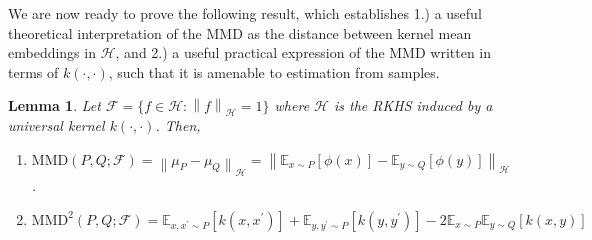 \documentclass[12pt]{article}
\newcommand*{\norm}[1]{\left\lVert#1\right\rVert}
\newcommand{\E}{\mathbb{E}}
\newcommand{\featureMap}{\phi}
\newcommand{\RKHS}{\mathcal{H}}
\newcommand{\Ker}{k}
\newcommand{\meanEmb}[1]{\mu_{#1}}
\newcommand{\MMD}{\text{MMD}}
\newcommand{\MMDSpace}{\mathcal{F}}
\newtheorem{lemma}{Lemma}
\begin{document}
We are now ready to prove the following result, which establishes 1.) a useful theoretical interpretation of the MMD as the distance between kernel mean embeddings in 
$\RKHS$, and 2.) a useful practical expression of the MMD written in terms of $\Ker(\cdot, \cdot)$, such that it is amenable to estimation from samples. 

\begin{lemma} 
Let $\MMDSpace = \{f \in \RKHS: \norm{f}_{\RKHS} = 1\}$ where $\RKHS$ is the RKHS induced by a universal kernel $\Ker(\cdot, \cdot)$. Then, 
\begin{enumerate}
\item $\MMD(P, Q; \MMDSpace) = \norm{\meanEmb{P} - \meanEmb{Q}}_{\RKHS} = \norm{\E_{x \sim P}[\featureMap(x)] - \E_{y \sim Q}[\featureMap(y)]}_{\RKHS}$.
\item $\MMD^2(P, Q; \MMDSpace) = \E_{x, x^\prime \sim P}\left[\Ker(x, x^\prime)\right] + \E_{y, y^\prime \sim P}\left[\Ker(y, y^\prime)\right] - 2 \E_{x \sim P}\E_{y \sim Q} \left[\Ker(x, y)\right]$
\end{enumerate}
\end{lemma}
\end{document}
